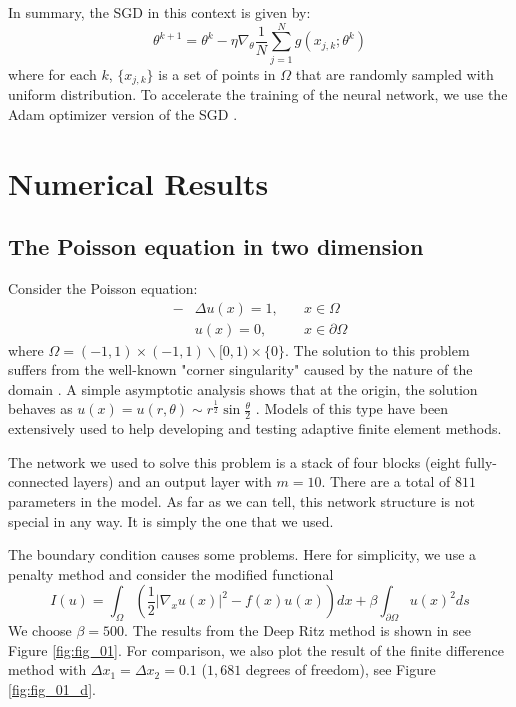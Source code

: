 \documentclass[a4paper,12pt]{article}
\begin{document}
In summary, the SGD in this context is given by:
\begin{equation}
\theta^{k+1} = \theta^{k} - \eta \nabla_\theta \frac 1 N
\sum_{j=1}^{N} g(x_{j, k}; \theta^k)
\label{eq:sga_iter_var}
\end{equation}
where for each $k$, $\{x_{j, k} \}$ is a set of points in $\Omega$
that are randomly sampled with uniform distribution. To accelerate 
the training of the neural network, we use the Adam optimizer version of the
SGD \cite{adam}.



\section{Numerical Results}

\subsection{The Poisson equation in two dimension} 

Consider the Poisson equation:
\begin{equation}
\begin{aligned}
-&\Delta u(x)=1,\quad &x\in \Omega\\
&u(x)=0,\quad &x\in \partial \Omega
\end{aligned}
\end{equation}
where $\Omega=(-1,1)\times (-1,1) \backslash [0,1)\times \{0\}$.
The solution to this problem suffers from the well-known "corner singularity"
caused by the nature of the domain \cite{Strang-Fix}.  
A simple asymptotic analysis shows that at the origin,  the solution
behaves as
$u(x)=u(r,\theta) \sim r^{\frac{1}{2}}\sin\frac{\theta}{2}$
\cite{Strang-Fix}.
Models of this type have been extensively used
to help developing and testing adaptive finite element methods.

The network we used to solve this problem is a stack of
four blocks (eight fully-connected layers) and an output layer
with $m=10$.  There are a total of $811$ parameters in the model.
As far as we can tell, this network structure is not special in any way. It is simply the one that we used.



The boundary condition causes some problems.
Here for simplicity, we use a penalty method and consider 
the modified functional
\begin{equation}
I(u) = \int_\Omega \left( \frac{1}{2} |\nabla_x u(x)|^2 - f(x) u(x) \right) dx
+\beta \int_{\partial \Omega} u(x)^2 ds 
\end{equation}
We choose $\beta = 500$.
The results from the Deep Ritz method is shown in
see Figure \ref{fig:fig_01}. For comparison, we also plot the result
of the finite difference method with $\Delta x_1=\Delta x_2=0.1$ ($1,681$ 
degrees of freedom), see Figure \ref{fig:fig_01_d}.
\end{document}
